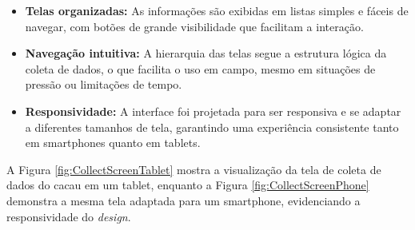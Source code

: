 \begin{itemize}
    \item \textbf{Telas organizadas:} As informações são exibidas em listas simples e fáceis de navegar, com botões de grande visibilidade que facilitam a interação.

    \item \textbf{Navegação intuitiva:} A hierarquia das telas segue a estrutura lógica da coleta de dados, o que facilita o uso em campo, mesmo em situações de pressão ou limitações de tempo.

    \item \textbf{Responsividade:} A interface foi projetada para ser responsiva e se adaptar a diferentes tamanhos de tela, garantindo uma experiência consistente tanto em smartphones quanto em tablets.
\end{itemize}

A Figura \ref{fig:CollectScreenTablet} mostra a visualização da tela de coleta de dados do cacau em um tablet, enquanto a Figura \ref{fig:CollectScreenPhone} demonstra a mesma tela adaptada para um smartphone, evidenciando a responsividade do \textit{design}.

